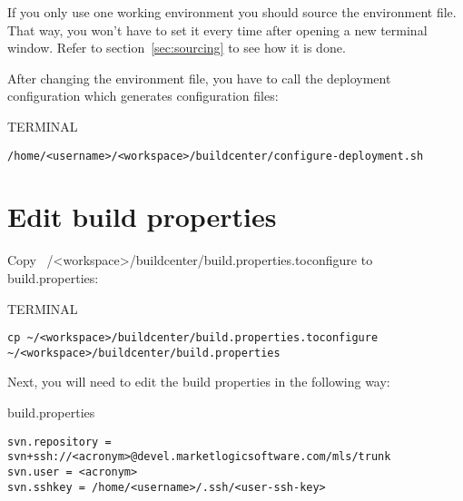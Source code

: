 \documentclass[10pt,a4paper]{article}
\begin{document}
\vspace{\baselineskip}

\tip{}If you only use one working environment you should source the environment file. That way, you won't have to set it every time after opening a new terminal window. Refer to section~\ref{sec:sourcing} to see how it is done.

\newpage

After changing the environment file, you have to call the deployment configuration which generates configuration files:

\begin{command}{TERMINAL}

\noindent
{}
\begin{lstlisting}
/home/<username>/<workspace>/buildcenter/configure-deployment.sh
\end{lstlisting}
\end{command}



\newpage
\section{Edit build properties}
Copy ~/<workspace>/buildcenter/build.properties.toconfigure to build.properties:

\begin{command}{TERMINAL}

\noindent
{}
\begin{lstlisting}
cp ~/<workspace>/buildcenter/build.properties.toconfigure ~/<workspace>/buildcenter/build.properties
\end{lstlisting}
\end{command}

\vspace{\baselineskip}

\noindent
Next, you will need to edit the build properties in the following way:

\begin{command}{build.properties}
\begin{lstlisting}
svn.repository = svn+ssh://<acronym>@devel.marketlogicsoftware.com/mls/trunk
svn.user = <acronym>
svn.sshkey = /home/<username>/.ssh/<user-ssh-key>
\end{lstlisting}
\codenote{}
\end{command}
\end{document}
